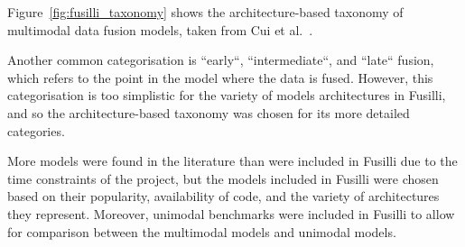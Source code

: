 Figure~\ref{fig:fusilli_taxonomy} shows the architecture-based taxonomy of multimodal data fusion models, taken from Cui et al.~\cite{cuiDeepMultimodalFusion2022}.

Another common categorisation is ``early``, ``intermediate``, and ``late`` fusion, which refers to the point in the model where the data is fused.
However, this categorisation is too simplistic for the variety of models architectures in Fusilli, and so the architecture-based taxonomy was chosen for its more detailed categories.

More models were found in the literature than were included in Fusilli due to the time constraints of the project, but the models included in Fusilli were chosen based on their popularity, availability of code, and the variety of architectures they represent.
Moreover, unimodal benchmarks were included in Fusilli to allow for comparison between the multimodal models and unimodal models.


